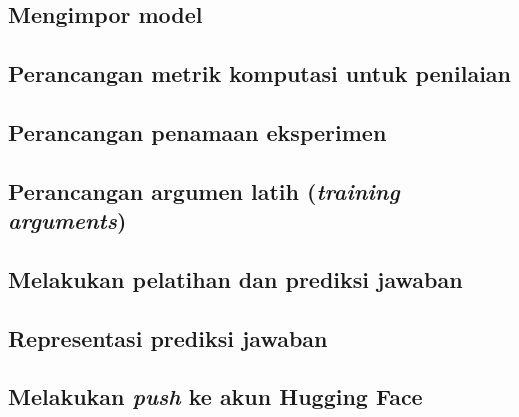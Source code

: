 \subsection{Mengimpor model}

\subsection{Perancangan metrik komputasi untuk penilaian}

\subsection{Perancangan penamaan eksperimen}

\subsection{Perancangan argumen latih (\emph{training arguments})}

\subsection{Melakukan pelatihan dan prediksi jawaban}

\subsection{Representasi prediksi jawaban}

\subsection{Melakukan \emph{push} ke akun Hugging Face}


